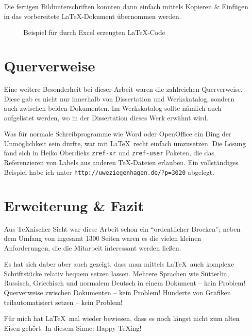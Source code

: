 \documentclass[12pt,ngerman]{dtk}
\begin{document}
Die fertigen Bildunterschriften konnten dann einfach mittels Kopieren \& Einfügen in das vorbereitete \LaTeX-Dokument übernommen werden.

\begin{figure}
\caption{Beispiel für durch Excel erzeugten \LaTeX-Code}\label{fig:excel}
\end{figure}

\section{Querverweise}

Eine weitere Besonderheit bei dieser Arbeit waren die zahlreichen Querverweise. Diese gab es nicht nur innerhalb von Dissertation und Werkskatalog, sondern auch zwischen beiden Dokumenten. Im Werkskatalog sollte nämlich auch aufgelistet werden, wo in der Dissertation dieses Werk erwähnt wird. 

Was für normale Schreibprogramme wie Word oder OpenOffice ein Ding der Unmöglichkeit sein dürfte, war mit \LaTeX\ recht einfach umzusetzen. Die Lösung fand sich in Heiko Oberdieks \texttt{zref-xr} und \texttt{zref-user} Paketen, die das Referenzieren von Labels aus anderen \TeX-Dateien erlauben. Ein vollständiges Beispiel habe ich unter \texttt{http://uweziegenhagen.de/?p=3020} abgelegt.

\section{Erweiterung \& Fazit}

Aus \TeX nischer Sicht war diese Arbeit schon ein \enquote{ordentlicher Brocken}; neben dem Umfang von ingesamt 1300 Seiten waren
es die vielen kleinen Anforderungen, die die Mitarbeit interessant werden ließen. 

Es hat sich daber aber auch gezeigt, dass man mittels \LaTeX\ auch komplexe Schriftstücke relativ bequem setzen lassen. Mehrere Sprachen wie Sütterlin, Russisch, Griechisch und normalem Deutsch in einem Dokument -- kein Problem! Querverweise zwischen Dokumenten -- kein Problem! Hunderte von Grafiken teilautomatisiert setzen -- kein Problem!

Für mich hat \LaTeX\ mal wieder bewiesen, dass es noch längst nicht zum alten Eisen gehört. In diesem Sinne: Happy \TeX ing!
\end{document}
